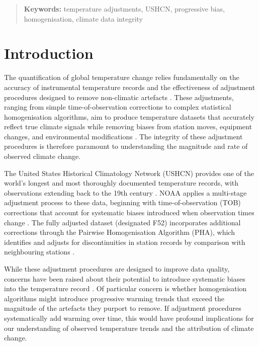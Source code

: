 \documentclass[11pt, a4paper]{article}
\begin{document}
\begin{abstract}
\vspace{0.5em}
\noindent\textbf{Keywords:} temperature adjustments, USHCN, progressive bias, homogenisation, climate data integrity

\end{abstract}

\section{Introduction}

The quantification of global temperature change relies fundamentally on the accuracy of instrumental temperature records and the effectiveness of adjustment procedures designed to remove non-climatic artefacts \parencite{jones2012assessment}. These adjustments, ranging from simple time-of-observation corrections to complex statistical homogenisation algorithms, aim to produce temperature datasets that accurately reflect true climate signals while removing biases from station moves, equipment changes, and environmental modifications \parencite{trewin2010exposure}. The integrity of these adjustment procedures is therefore paramount to understanding the magnitude and rate of observed climate change.

The United States Historical Climatology Network (USHCN) provides one of the world's longest and most thoroughly documented temperature records, with observations extending back to the 19th century \parencite{menne2009ushcn}. NOAA applies a multi-stage adjustment process to these data, beginning with time-of-observation (TOB) corrections that account for systematic biases introduced when observation times change \parencite{karl1986tobs,vose2003tobs}. The fully adjusted dataset (designated F52) incorporates additional corrections through the Pairwise Homogenisation Algorithm (PHA), which identifies and adjusts for discontinuities in station records by comparison with neighbouring stations \parencite{menne2009homogenization,williams2012benchmarking}.

While these adjustment procedures are designed to improve data quality, concerns have been raised about their potential to introduce systematic biases into the temperature record \parencite{mcintyre2007station,watts2009surface,connolly2021evaluation}. Of particular concern is whether homogenisation algorithms might introduce progressive warming trends that exceed the magnitude of the artefacts they purport to remove. If adjustment procedures systematically add warming over time, this would have profound implications for our understanding of observed temperature trends and the attribution of climate change.
\end{document}
